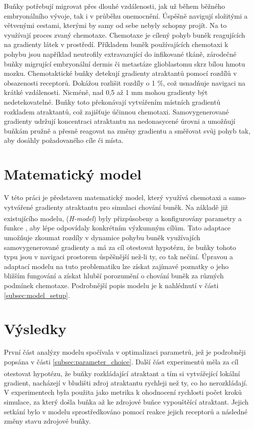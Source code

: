 \documentclass[10pt,a4paper,twocolumn]{article}
\begin{document}
Buňky potřebují migrovat přes dlouhé vzdálenosti, jak už během běžného
embryonálního vývoje, tak i v průběhu onemocnění. Úspěšně navigují složitými a
větvenými cestami, kterými by samy od sebe nebyly schopny projít. Na to využívají
proces zvaný chemotaxe. Chemotaxe je cílený pohyb buněk reagujících na
gradienty látek v prostředí. Příkladem buněk používajících chemotaxi k pohybu
jsou například neutrofily extravazující do infikované tkáně, zárodečné buňky
migrující embryonální dermis či metastáze glioblastomu skrz bílou hmotu mozku.
Chemotaktické buňky detekují gradienty atraktantů pomocí rozdílů v obsazenosti
receptorů. Dokážou rozlišit rozdíly o 1 \%, což usnadňuje navigaci na krátké
vzdálenosti. Nicméně, nad 0,5 až 1 mm mohou gradienty být nedetekovatelné.
Buňky toto překonávají vytvářením místních gradientů rozkladem atraktantů, což
zajišťuje účinnou chemotaxi. Samovygenerované gradienty udržují koncentraci
atraktantu na nedonasycené úrovni a umožňují buňkám pružně a přesně reagovat
na změny gradientu a směřovat svůj pohyb tak, aby dosáhly požadovaného cíle či
místa.


\section{Matematický model}
V této práci je představen matematický model, který využívá chemotaxi a samo-vytvářené gradienty atraktantu pro simulaci chování buněk. Na základě již existujícího modelu, (\emph{H-model})\textsuperscript{\cite{h-model}} 
byly přizpůsobeny a konfigurovány parametry a funkce%
, aby lépe odpovídaly konkrétním výzkumným cílům. Tato adaptace umožňuje zkoumat rozdíly v dynamice pohybu buněk využívajích samovygenerované gradienty a má za cíl otestovat hypotézu, že buňky tohoto typu jsou v navigaci prostorem úspěšnější než-li ty, co tak nečiní. Úpravou a adaptací modelu na tuto problematiku lze získat zajímavé  poznatky o jeho bližším fungování a získat hlubší porozumění o chování buněk za různých podmínek chemotaxe. Podrobnější popis modelu
je k nahlédnutí v části \ref{subsec:model_setup}.



\section{Výsledky}

První část analýzy modelu spočívala v optimalizaci parametrů, jež je podrobněji popsána v části \ref{subsec:parameter_choice}.
Další část experimentů měla za cíl otestovat hypotézu\textsuperscript{\cite{tweedy2020}}, že buňky rozkládající atraktant a tím si vytvářející lokální gradient, nacházejí v bludišti zdroj atraktantu rychleji  než ty, co ho nerozkládají. 
V experimentech byla použita jako metrika k ohodnocení rychlosti počet kroků simulace, za který došla buňka až ke zdrojové buňce vypouštěící atraktant. Jejich setkání bylo v modelu sprostředkováno pomocí reakce jejich receptorů a následné změny stavu zdrojové buňky.
\end{document}
